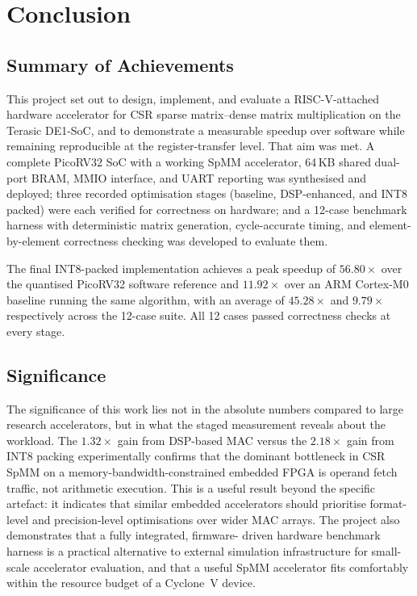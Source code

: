 \chapter{Conclusion}
\label{ch:conclusion}

\section{Summary of Achievements}

This project set out to design, implement, and evaluate a RISC-V-attached
hardware accelerator for CSR sparse matrix--dense matrix multiplication on the
Terasic DE1-SoC, and to demonstrate a measurable speedup over software while
remaining reproducible at the register-transfer level. That aim was met. A
complete PicoRV32 SoC with a working SpMM accelerator, 64\,KB shared
dual-port BRAM, MMIO interface, and UART reporting was synthesised and
deployed; three recorded optimisation stages (baseline, DSP-enhanced, and
INT8 packed) were each verified for correctness on hardware; and a 12-case
benchmark harness with deterministic matrix generation, cycle-accurate timing,
and element-by-element correctness checking was developed to evaluate them.

The final INT8-packed implementation achieves a peak speedup of
$\mathbf{56.80\times}$ over the quantised PicoRV32 software reference and
$\mathbf{11.92\times}$ over an ARM Cortex-M0 baseline running the same
algorithm, with an average of $45.28\times$ and $9.79\times$ respectively
across the 12-case suite. All 12 cases passed correctness checks at every
stage.

\section{Significance}

The significance of this work lies not in the absolute numbers compared to
large research accelerators, but in what the staged measurement reveals about
the workload. The $1.32\times$ gain from DSP-based MAC versus the
$2.18\times$ gain from INT8 packing experimentally confirms that the dominant
bottleneck in CSR SpMM on a memory-bandwidth-constrained embedded FPGA is
operand fetch traffic, not arithmetic execution. This is a useful result
beyond the specific artefact: it indicates that similar embedded accelerators
should prioritise format-level and precision-level optimisations over wider
MAC arrays. The project also demonstrates that a fully integrated, firmware-
driven hardware benchmark harness is a practical alternative to external
simulation infrastructure for small-scale accelerator evaluation, and that a
useful SpMM accelerator fits comfortably within the resource budget of a
Cyclone~V device.

